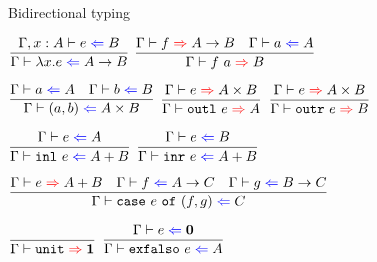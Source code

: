 \documentclass{beamer}
\newcommand{\Fun}[2]{#1 \to #2}
\newcommand{\Prod}[2]{#1 \times #2}
\newcommand{\Sum}[2]{#1 + #2}
\newcommand{\Unit}{\textbf{1}}
\newcommand{\Empty}{\textbf{0}}
\newcommand{\fun}[2]{\lambda #1. #2}
\newcommand{\app}[2]{#1\ #2}
\newcommand{\pair}[2]{(#1, #2)}
\newcommand{\outl}[1][]{\texttt{outl}\ #1}
\newcommand{\outr}[1][]{\texttt{outr}\ #1}
\newcommand{\inl}[1][]{\texttt{inl}\ #1}
\newcommand{\inr}[1][]{\texttt{inr}\ #1}
\newcommand{\case}[3]{\texttt{case}\ #1\ \texttt{of}\ (#2, #3)}
\newcommand{\unit}{\texttt{unit}}
\newcommand{\elimEmpty}[1][]{\texttt{exfalso}\ #1}
\newcommand{\infrule}[3][]{\displaystyle \frac{#2}{#3} \textsc{\footnotesize{#1}}}
\newcommand{\extend}[3]{#1, #2 : #3}
\begin{document}
\begin{frame}{Bidirectional typing}

\begin{center}

  $\infrule{\fullcheck{\extend{\Gamma}{x}{A}}{e}{B}}{\check{\fun{x}{e}}{\Fun{A}{B}}}$ \quad
  $\infrule{\infer{f}{\Fun{A}{B}} \quad \check{a}{A}}{\infer{\app{f}{a}}{B}}$

  \vspace{2em}

  $\infrule{\check{a}{A} \quad \check{b}{B}}{\check{\pair{a}{b}}{\Prod{A}{B}}}$ \quad
  $\infrule{\infer{e}{\Prod{A}{B}}}{\infer{\outl[e]}{A}}$ \quad
  $\infrule{\infer{e}{\Prod{A}{B}}}{\infer{\outr[e]}{B}}$

  \vspace{2em}

  $\infrule{\check{e}{A}}{\check{\inl[e]}{\Sum{A}{B}}}$ \quad
  $\infrule{\check{e}{B}}{\check{\inr[e]}{\Sum{A}{B}}}$

  \vspace{2em}

  $\infrule{\infer{e}{\Sum{A}{B}} \quad \check{f}{\Fun{A}{C}} \quad \check{g}{\Fun{B}{C}}}{\check{\case{e}{f}{g}}{C}}$

  \vspace{2em}

  $\infrule{}{\infer{\unit}{\Unit}}$ \quad
  $\infrule{\check{e}{\Empty}}{\check{\elimEmpty[e]}{A}}$

\end{center}

\end{frame}
\end{document}
